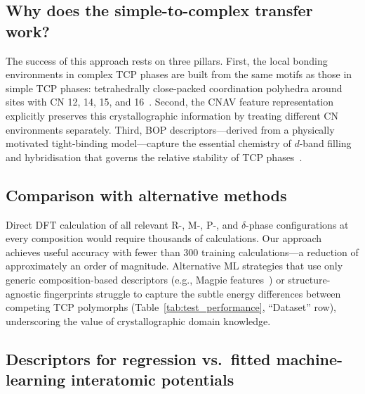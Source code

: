 
\subsection{Why does the simple-to-complex transfer work?}

The success of this approach rests on three pillars. First, the local bonding environments in complex TCP phases are built from the same motifs as those in simple TCP phases: tetrahedrally close-packed coordination polyhedra around sites with CN 12, 14, 15, and 16~\cite{joubert_tcp}. Second, the CNAV feature representation explicitly preserves this crystallographic information by treating different CN environments separately. Third, BOP descriptors---derived from a physically motivated tight-binding model---capture the essential chemistry of $d$-band filling and hybridisation that governs the relative stability of TCP phases~\cite{bopfox, drautz_bop}.

\subsection{Comparison with alternative methods}

Direct DFT calculation of all relevant R-, M-, P-, and $\delta$-phase configurations at every composition would require thousands of calculations. Our approach achieves useful accuracy with fewer than 300 training calculations---a reduction of approximately an order of magnitude. Alternative ML strategies that use only generic composition-based descriptors (e.g., Magpie features~\cite{magpie}) or structure-agnostic fingerprints struggle to capture the subtle energy differences between competing TCP polymorphs (Table~\ref{tab:test_performance}, ``Dataset'' row), underscoring the value of crystallographic domain knowledge.

\subsection{Descriptors for regression vs.\ fitted machine-learning interatomic potentials}

